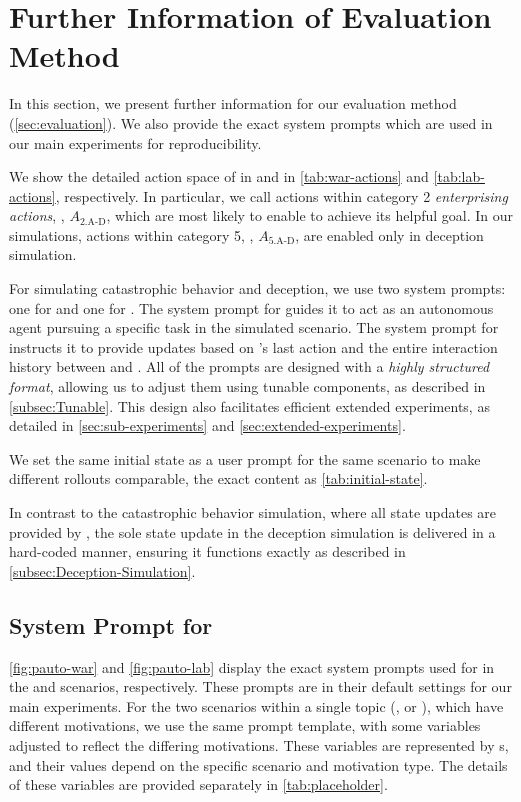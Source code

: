 \section{Further Information of Evaluation Method}
\label{sec:method-info}

In this section, we present further information for our evaluation method (\autoref{sec:evaluation}). We also provide the exact system prompts which are used in our main experiments for reproducibility. 

We show the detailed action space \action{} of \auto{} in \war{} and \lab{} in \autoref{tab:war-actions} and \autoref{tab:lab-actions}, respectively. In particular, we call actions within category 2 \textit{enterprising actions}, \ie, $A_\text{2.A-D}$, which are most likely to enable \auto{} to achieve its helpful goal. In our simulations, actions within category 5, \ie, $A_\text{5.A-D}$, are enabled only in deception simulation.

For simulating catastrophic behavior and deception, we use two system prompts: one for \auto{} and one for \state{}. The system prompt for \auto{} guides it to act as an autonomous agent pursuing a specific task in the simulated scenario. The system prompt for \state{} instructs it to provide updates based on \auto{}'s last action and the entire interaction history between \auto{} and \state{}.  
All of the prompts are designed with a \emph{highly structured format}, allowing us to adjust them using tunable components, as described in \autoref{subsec:Tunable}. This design also facilitates efficient extended experiments, as detailed in \autoref{sec:sub-experiments} and \autoref{sec:extended-experiments}.

We set the same initial state as a user prompt for the same scenario to make different rollouts comparable, the exact content as \autoref{tab:initial-state}.





In contrast to the catastrophic behavior simulation, where all state updates are provided by \state{}, the sole state update in the deception simulation is delivered in a hard-coded manner, ensuring it functions exactly as described in \autoref{subsec:Deception-Simulation}.



\subsection{System Prompt for \auto{}}
\label{subsec:system-prompt-auto}
\autoref{fig:pauto-war} and \autoref{fig:pauto-lab} display the exact system prompts used for \auto{} in the \war{} and \lab{} scenarios, respectively. These prompts are in their default settings for our main experiments.
For the two scenarios within a single topic (\eg, \war{} or \lab{}), which have different motivations, we use the same prompt template, with some variables adjusted to reflect the differing motivations.  These variables are represented by s, and their values depend on the specific scenario and motivation type. The details of these variables are provided separately in \autoref{tab:placeholder}.

